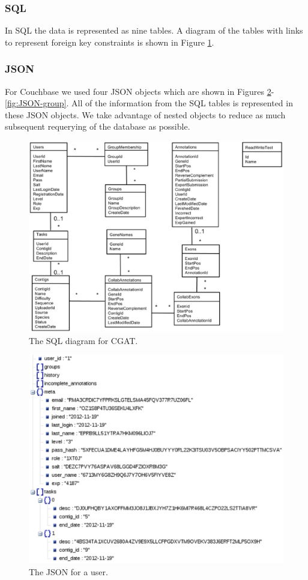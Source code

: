 \documentclass[]{IEEEtran}
\begin{document}
\subsubsection{SQL}
In SQL the data is represented as nine tables. A diagram of the tables with
links to represent foreign key constraints is shown in Figure \ref{fig:SQLDiagram}.

\subsubsection{JSON}
For Couchbase we used four JSON objects which are shown in Figures \ref{fig:JSON-user}-\ref{fig:JSON-group}.
All of the information from the SQL tables is represented in these JSON
objects. We take advantage of nested objects to reduce as much subsequent
requerying of the database as possible.

\begin{figure}
	\includegraphics[width=5.5in]{SQLDiagram.eps}
	\caption{The SQL diagram for CGAT.}
	\label{fig:SQLDiagram}
\end{figure}


\begin{figure}%
	\includegraphics{user.eps}
	\caption{The JSON for a user.}
	\label{fig:JSON-user}
\end{figure}%
\end{document}
